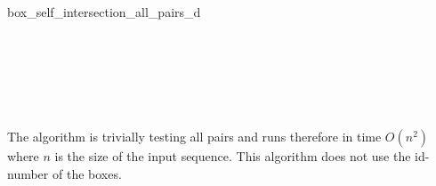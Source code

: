 \begin{ccRefFunction}{box_self_intersection_all_pairs_d}
\ccSeeAlso

\\
\\

\\
\\

\ccImplementation

The algorithm is trivially testing all pairs and runs therefore in time
$O(n^2)$ where $n$ is the size of the input sequence. This algorithm
does not use the {id}-number of the boxes.

\end{ccRefFunction}


